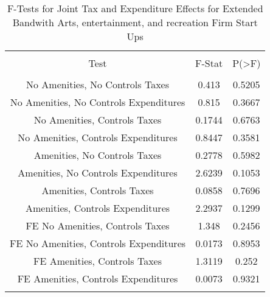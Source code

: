 
\begin{table}[!htbp] \centering 
  \caption{F-Tests for Joint Tax and Expenditure Effects for Extended Bandwith Arts, entertainment, and recreation Firm Start Ups} 
  \label{71Ftests} 
\begin{tabular}{@{\extracolsep{5pt}} ccc} 
\\[-1.8ex]\hline 
\hline \\[-1.8ex] 
Test & F-Stat & P(\textgreater F) \\ 
\hline \\[-1.8ex] 
No Amenities, No Controls Taxes & 0.413 & 0.5205 \\ 
No Amenities, No Controls Expenditures & 0.815 & 0.3667 \\ 
No Amenities, Controls Taxes & 0.1744 & 0.6763 \\ 
No Amenities, Controls Expenditures & 0.8447 & 0.3581 \\ 
Amenities, No Controls Taxes & 0.2778 & 0.5982 \\ 
Amenities, No Controls Expenditures & 2.6239 & 0.1053 \\ 
Amenities, Controls Taxes & 0.0858 & 0.7696 \\ 
Amenities, Controls Expenditures & 2.2937 & 0.1299 \\ 
FE No Amenities, Controls Taxes & 1.348 & 0.2456 \\ 
FE No Amenities, Controls Expenditures & 0.0173 & 0.8953 \\ 
FE Amenities, Controls Taxes & 1.3119 & 0.252 \\ 
FE Amenities, Controls Expenditures & 0.0073 & 0.9321 \\ 
\hline \\[-1.8ex] 
\end{tabular} 
\end{table} 
